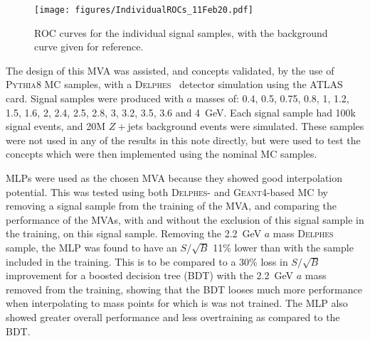 \documentclass[NOTE, atlasdraft=true, texlive=2017, UKenglish]{\ATLASLATEXPATH atlasdoc}
\begin{document}
\begin{figure}[!htbp]
  \centering
  \texttt{[image: figures/IndividualROCs\_11Feb20.pdf]}
  \caption{ROC curves for the individual signal samples, with the background curve given for reference.}
  \label{fig:ROCssep}
\end{figure}



The design of this MVA was assisted, and concepts validated, by the use of \textsc{Pythia}8 MC samples, with a \textsc{Delphes}~\cite{deFavereau:2013fsa} detector simulation using the ATLAS card. Signal samples were produced with $a$ masses of: 0.4, 0.5, 0.75, 0.8, 1, 1.2, 1.5, 1.6, 2, 2.4, 2.5, 2.8, 3, 3.2, 3.5, 3.6 and 4~GeV. Each signal sample had 100k signal events, and 20M $Z+$jets background events were simulated. These samples were not used in any of the results in this note directly, but were used to test the concepts which were then implemented using the nominal MC samples.

MLPs were used as the chosen MVA because they showed good interpolation potential. This was tested using both \textsc{Delphes}- and \textsc{Geant}4-based MC by removing a signal sample from the training of the MVA, and comparing the performance of the MVAs, with and without the exclusion of this signal sample in the training, on this signal sample. Removing the 2.2~GeV $a$ mass \textsc{Delphes} sample, the MLP was found to have an $S/\sqrt{B}$ 11\% lower than with the sample included in the training. This is to be compared to a 30\% loss in $S/\sqrt{B}$ improvement for a boosted decision tree (BDT) with the 2.2~GeV $a$ mass removed from the training, showing that the BDT looses much more performance when interpolating to mass points for which is was not trained. The MLP also showed greater overall performance and less overtraining as compared to the BDT.

\end{document}
